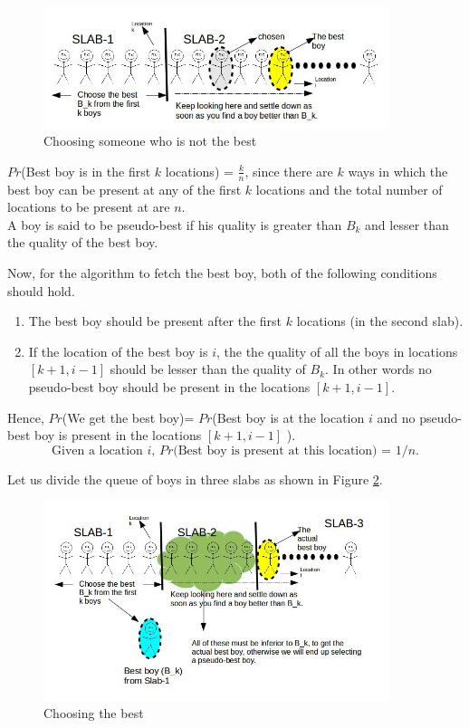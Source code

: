 \documentclass{book}
\begin{document}
\begin{figure}[h]
\centering
\includegraphics[width=0.9\textwidth]{hero.jpg}
\caption{Choosing someone who is not the best}
\label{hero}
\end{figure}

$Pr$(Best boy is in the first $k$ locations) = $ \frac{k}{n}$, since there are $k$ ways in which the best boy can be present at any of the first $k$ locations and the total number of locations to be present at are $n$. \\

A boy is said to be pseudo-best if his quality is greater than $B_k$ and lesser than the quality of the best boy.
 
Now, for the algorithm to fetch the best boy, both of the following conditions should hold.
\begin{enumerate}
\item The best boy should be present after the first $k$ locations (in the second slab). 
\item If the location of the best boy is $i$, the the quality of all the boys in locations $[k+1,i-1]$ should be lesser than the quality of $B_k$. In other words no pseudo-best boy should be present in the locations $[k+1,i-1]$.
\end{enumerate}

Hence, $Pr$(We get the best boy)= $Pr$(Best boy is at the location $i$ and no pseudo-best boy is present in the locations $[k+1,i-1]$ ).\\

\begin{equation}\label{eq1}
\text{Given a location $i$, $Pr$(Best boy is present at this location) = $1/n$.}
\end{equation}

Let us divide the queue of boys in three slabs as shown in Figure \ref{slabs}.

\begin{figure}[h!]
\centering
\includegraphics[width=0.9\textwidth]{slabs.jpg}
\caption{Choosing the best}
\label{slabs}
\end{figure}
\end{document}
